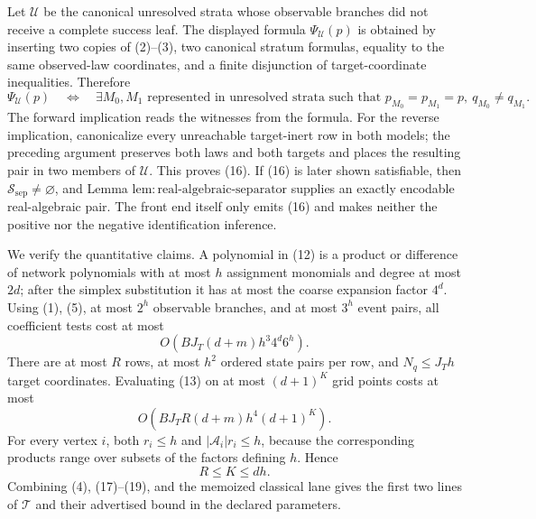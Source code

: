 Let \(\mathcal U\) be the canonical unresolved strata whose observable branches did not receive a complete success leaf. The displayed formula \(\Psi_{\mathcal U}(p)\) is obtained by inserting two copies of (2)--(3), two canonical stratum formulas, equality to the same observed-law coordinates, and a finite disjunction of target-coordinate inequalities. Therefore
\[
 \Psi_{\mathcal U}(p)
 \quad\Longleftrightarrow\quad
 \exists M_0,M_1\text{ represented in unresolved strata such that }
 p_{M_0}=p_{M_1}=p,
 \ q_{M_0}\ne q_{M_1}.
 \tag{16}
\]
The forward implication reads the witnesses from the formula. For the reverse implication, canonicalize every unreachable target-inert row in both models; the preceding argument preserves both laws and both targets and places the resulting pair in two members of \(\mathcal U\). This proves (16). If (16) is later shown satisfiable, then \(\mathcal S_{\mathrm{sep}}\ne\varnothing\), and Lemma \(\mathrm{lem:real\text{-}algebraic\text{-}separator}\) supplies an exactly encodable real-algebraic pair. The front end itself only emits (16) and makes neither the positive nor the negative identification inference.

We verify the quantitative claims. A polynomial in (12) is a product or difference of network polynomials with at most \(h\) assignment monomials and degree at most \(2d\); after the simplex substitution it has at most the coarse expansion factor \(4^d\). Using (1), (5), at most \(2^h\) observable branches, and at most \(3^h\) event pairs, all coefficient tests cost at most
\[
 O\!\left(BJ_T(d+m)h^3 4^d6^h\right).
 \tag{17}
\]
There are at most \(R\) rows, at most \(h^2\) ordered state pairs per row, and \(N_q\le J_Th\) target coordinates. Evaluating (13) on at most \((d+1)^K\) grid points costs at most
\[
 O\!\left(BJ_TR(d+m)h^4(d+1)^K\right).
 \tag{18}
\]
For every vertex \(i\), both \(r_i\le h\) and \(|\mathcal A_i|r_i\le h\), because the corresponding products range over subsets of the factors defining \(h\). Hence
\[
 R\le K\le dh.
 \tag{19}
\]
Combining (4), (17)--(19), and the memoized classical lane gives the first two lines of \(\mathcal T\) and their advertised bound in the declared parameters.

